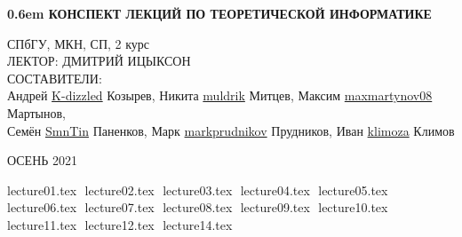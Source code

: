 \documentclass[12pt,letterpaper]{report}
\theoremstyle{definition}
\begin{document}
\clearpage
\newcommand\nbvspace[1][3]{\vspace*{\stretch{#1}}}
\newcommand\nbstretchyspace{\spaceskip0.5em plus 0.25em minus 0.25em}
\newcommand{\nbtitlestretch}{\spaceskip0.6em}
\pagestyle{empty}
\begin{center}
\bfseries
\nbvspace[1]
\Huge
{\nbtitlestretch\huge
КОНСПЕКТ ЛЕКЦИЙ ПО ТЕОРЕТИЧЕСКОЙ ИНФОРМАТИКЕ}

\nbvspace[1]
\normalsize

СПбГУ, МКН, СП, 2 курс\\
ЛЕКТОР: ДМИТРИЙ ИЦЫКСОН
\nbvspace[1]
\\
\Large СОСТАВИТЕЛИ:\\[0.5em]
\footnotesize
Андрей \href{https://github.com/K-dizzled}{K-dizzled} Козырев,
Никита  \href{https://github.com/muldrik}{muldrik} Митцев,
Максим \href{https://github.com/maxmartynov08}{maxmartynov08} Мартынов,\\
Семён \href{https://github.com/SmnTin}{SmnTin} Паненков,
Марк \href{https://github.com/markprudnikov}{markprudnikov} Прудников,
Иван \href{https://github.com/klimoza}{klimoza} Климов

\nbvspace[2]

\nbvspace[3]
\normalsize

\large
ОСЕНЬ 2021
\nbvspace[1]
\end{center}
\newpage
\pagestyle{plain}
\fi
\tableofcontents
\newpage
\begin{normalsize}
{lecture01.tex}
$ $
{lecture02.tex}
$ $
{lecture03.tex}
$ $
{lecture04.tex}
$ $
{lecture05.tex}
$ $
{lecture06.tex}
$ $
{lecture07.tex}
$ $
{lecture08.tex}
$ $
{lecture09.tex}
$ $
{lecture10.tex}
$ $
{lecture11.tex}
$ $
{lecture12.tex}
$ $
{lecture14.tex}
$ $
\end{normalsize}
\end{document}
